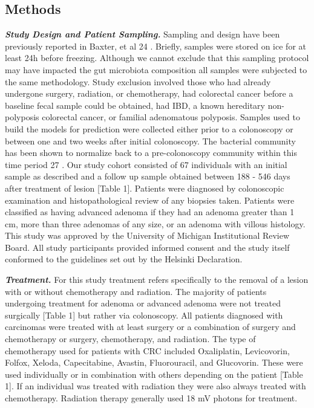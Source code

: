\documentclass[12pt,]{article}
\providecommand{\DIFaddtex}[1]{{\protect\color{blue}\uwave{#1}}} %
\providecommand{\DIFaddbegin}{} %
\providecommand{\DIFaddend}{} %
\providecommand{\DIFdelbegin}{} %
\providecommand{\DIFdelend}{} %
\providecommand{\DIFadd}[1]{\texorpdfstring{\DIFaddtex{#1}}{#1}} %
\begin{document}
\newpage

\subsection{Methods}\label{methods}

\textbf{\emph{Study Design and Patient Sampling.}} Sampling and design
have been previously reported in Baxter, et al \DIFdelbegin %
\DIFdelend \DIFaddbegin \DIFadd{(}\DIFaddend 24\DIFdelbegin %
\DIFdelend \DIFaddbegin \DIFadd{)}\DIFaddend . Briefly, samples
were stored on ice for at least 24h before freezing. Although we cannot
exclude that this sampling protocol may have impacted the gut microbiota
composition all samples were subjected to the same methodology. Study
exclusion involved those who had already undergone surgery, radiation,
or chemotherapy, had colorectal cancer before a baseline fecal sample
could be obtained, had IBD, a known hereditary non-polyposis colorectal
cancer, or familial adenomatous polyposis. Samples used to build the
models for prediction were collected either prior to a colonoscopy or
between one and two weeks after initial colonoscopy. The bacterial
community has been shown to normalize back to a pre-colonoscopy
community within this time period \DIFdelbegin %
\DIFdelend \DIFaddbegin \DIFadd{(}\DIFaddend 27\DIFdelbegin %
\DIFdelend \DIFaddbegin \DIFadd{)}\DIFaddend . Our study cohort consisted of 67
individuals with an initial sample as described and a follow up sample
obtained between 188 - 546 days after treatment of lesion {[}Table 1{]}.
Patients were diagnosed by colonoscopic examination and
histopathological review of any biopsies taken. Patients were classified
as having advanced adenoma if they had an adenoma greater than 1 cm,
more than three adenomas of any size, or an adenoma with villous
histology. This study was approved by the University of Michigan
Institutional Review Board. All study participants provided informed
consent and the study itself conformed to the guidelines set out by the
Helsinki Declaration.

\textbf{\emph{Treatment.}} For this study treatment refers specifically
to the removal of a lesion with or without chemotherapy and radiation.
The majority of patients undergoing treatment for adenoma or advanced
adenoma were not treated surgically {[}Table 1{]} but rather via
colonoscopy. All patients diagnosed with carcinomas were treated with at
least surgery or a combination of surgery and chemotherapy or surgery,
chemotherapy, and radiation. The type of chemotherapy used for patients
with CRC included Oxaliplatin, Levicovorin, Folfox, Xeloda,
Capecitabine, Avastin, Fluorouracil, and Glucovorin. These were used
individually or in combination with others depending on the patient
{[}Table 1{]}. If an individual was treated with radiation they were
also always treated with chemotherapy. Radiation therapy generally used
18 mV photons for treatment.
\end{document}
